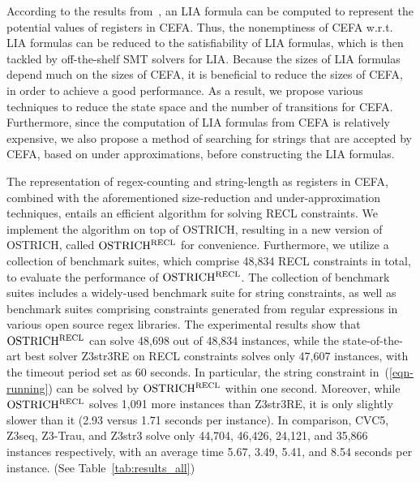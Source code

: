 According to the results from~\cite{atva2020}, an LIA formula can be computed to represent the potential values of registers in CEFA. Thus, the nonemptiness of CEFA w.r.t. LIA formulas can be reduced to the satisfiability of LIA formulas, which is then tackled by off-the-shelf SMT solvers for LIA. 
%
Because the sizes of LIA formulas depend much on the sizes of CEFA, it is beneficial to reduce the sizes of CEFA, in order to achieve a good performance. As a result, we propose various techniques to reduce the state space and the number of transitions for CEFA. Furthermore, since the computation of LIA formulas from CEFA is relatively expensive, we also propose a method of searching for strings that are accepted by CEFA, based on under approximations, before constructing the LIA formulas.  

The representation of regex-counting and string-length as registers in CEFA, combined with the aforementioned size-reduction and under-approximation techniques, entails an efficient algorithm for solving RECL constraints. We implement the algorithm on top of OSTRICH, resulting in a new version of OSTRICH, called $\rm OSTRICH^{RECL}$ for convenience. 
%
Furthermore, we utilize a collection of benchmark suites, which comprise 48,834 RECL constraints in total, to evaluate the performance of $\rm OSTRICH^{RECL}$. The collection of benchmark suites includes a widely-used benchmark suite for string constraints, as well as benchmark suites comprising constraints generated from regular expressions in various open source regex libraries. 
%
%
The experimental results show that $\rm OSTRICH^{RECL}$ can solve 48,698 out of 48,834 instances, while the state-of-the-art best solver Z3str3RE on RECL constraints solves only 47,607 instances, with the timeout period set as 60 seconds. In particular, the string constraint in~(\ref{eqn-running}) can be solved by $\rm OSTRICH^{RECL}$ within one second. 
Moreover, while $\rm OSTRICH^{RECL}$ solves 1,091 more instances than Z3str3RE, it is only slightly slower than it (2.93 versus 1.71 seconds per instance). 
In comparison, CVC5, Z3seq, Z3-Trau, and Z3str3 solve only 44,704, 46,426, 24,121, and 35,866 instances respectively, with an average time 5.67, 3.49, 5.41, and 8.54 seconds per instance. (See Table~\ref{tab:results_all})

